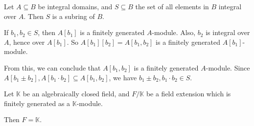 \documentclass[12pt]{article}
\begin{document}
\begin{lemma}
	Let $A \subseteq B$ be integral domains, and $S \subseteq B$ the set of all elements in $B$ integral over $A$. Then $S$ is a subring of $B$.
\end{lemma}

\begin{proofbox}
	If $b_1, b_2 \in S$, then $A[b_1]$ is a finitely generated $A$-module. Also, $b_2$ is integral over $A$, hence over $A[b_1]$. So $A[b_1][b_2] = A[b_1, b_2]$ is a finitely generated $A[b_1]$-module.

	From this, we can conclude that $A[b_1, b_2]$ is a finitely generated $A$-module. Since $A[b_1 \pm b_2], A[b_1 \cdot b_2] \subseteq A[b_1, b_2]$, we have $b_1 \pm b_2, b_1 \cdot b_2 \in S$.
\end{proofbox}

\begin{lemma}
	Let $\mathbb{K}$ be an algebraically closed field, and $F/\mathbb{K}$ be a field extension which is finitely generated as a $\mathbb{K}$-module.

	Then $F = \mathbb{K}$.
\end{lemma}
\end{document}
